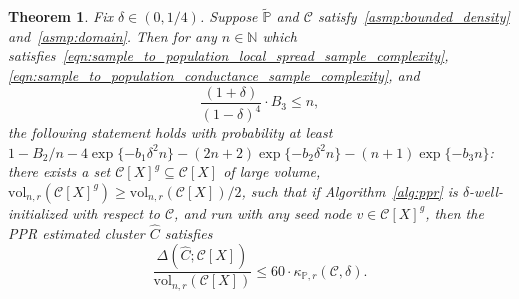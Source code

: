 \documentclass[11pt,twoside]{article}
\newtheorem{theorem}{Theorem}
\theoremstyle{definition}
\newcommand{\1}{\mathbf{1}}
\newcommand{\mc}[1]{\mathcal{#1}}
\newcommand{\Pbb}{\mathbb{P}}
\newcommand{\wt}[1]{\widetilde{#1}}
\newcommand{\wh}[1]{\widehat{#1}}
\newcommand{\vol}{\mathrm{vol}}
\begin{document}
\begin{theorem}
	\label{thm:volume_ssd_ub} 
	Fix $\delta \in (0,1/4)$. Suppose $\wt{\Pbb}$ and $\mc{C}$ satisfy~\ref{asmp:bounded_density} and~\ref{asmp:domain}. Then for any $n \in \mathbb{N}$ which satisfies~\eqref{eqn:sample_to_population_local_spread_sample_complexity}, \eqref{eqn:sample_to_population_conductance_sample_complexity}, and
	\begin{equation}
	\label{eqn:volume_ssd_ub_sample_complexity}
	\frac{(1 + \delta)}{(1 - \delta)^4} \cdot B_3 \leq n,
	\end{equation} 
	the following statement holds with probability at least $1 - B_2/n - 4\exp\{-b_1\delta^2n\} - (2n + 2)\exp\{-b_2\delta^2n\} - (n + 1)\exp\{-b_3n\}$: there exists a set $\mc{C}[X]^g \subseteq \mc{C}[X]$ of large volume, $\vol_{n,r}(\mc{C}[X]^g) \geq \vol_{n,r}(\mc{C}[X])/2$, such that if Algorithm~\ref{alg:ppr} is $\delta$-well-initialized with respect to $\mc{C}$, and run with any seed node $v \in \mc{C}[X]^g$, then the PPR estimated cluster $\wh{C}$ satisfies
	\begin{equation}
	\label{eqn:volume_ssd_ub}
	\frac{\Delta(\wh{C};\mc{C}[X])}{\vol_{n,r}(\mc{C}[X])} \leq 60 \cdot \kappa_{\Pbb,r}(\mc{C},\delta).
	\end{equation}
\end{theorem}
%
% 
\end{document}
